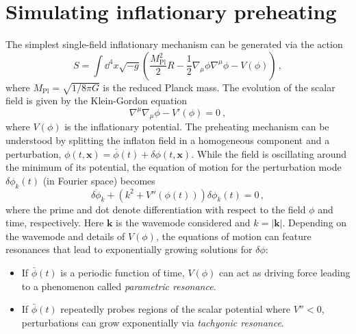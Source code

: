 \documentclass[
    reprint,
    preprintnumbers,
    superscriptaddress,
    nofootinbib,
     amsmath,amssymb,
     aps,
     prd,
    floatfix,
    ]{revtex4-2}
\newcommand{\mpl}{M_\mathrm{Pl}}
\begin{document}
\newpage

\section{Simulating inflationary preheating}
\label{sec:methods}

The simplest single-field inflationary mechanism can be generated via the action \begin{equation}
    S = \int \dd^4 x \sqrt{-g}\left(\frac{\mpl^2}{2}R - \frac{1}{2}\nabla_{\mu}\phi\nabla^{\mu}\phi - V(\phi)\right)\,,
\end{equation}
where $\mpl = \sqrt{1/8\pi G}$ is the reduced Planck mass. The evolution of the scalar field is given by the Klein-Gordon equation
\begin{equation}\label{eq:EKG_cov}
    \nabla^\mu \nabla_\mu \phi - V'(\phi) = 0~,
\end{equation}
where $V(\phi)$ is the inflationary potential. The preheating mechanism can be understood by splitting the inflaton field in a homogeneous component and a perturbation, $\phi(t, \mathbf{x}) = \bar{\phi}(t) + \delta\phi(t, \mathbf{x})$. While the field is oscillating around the minimum of its potential, %
the equation of motion for the perturbation mode $\delta\phi_k(t)$ (in Fourier space) becomes
\begin{equation}
    \delta\ddot\phi_k + \left(k^2 + V''\left(\phi(t)\right)\right) \delta\phi_k(t) = 0  \,,
    \label{eq:PerturbationsEOM}
\end{equation}
where the prime and dot denote differentiation with respect to the field $\phi$ and time, respectively. Here $\mathbf{k}$ is the wavemode considered and $k = |\mathbf{k}|$. Depending on the wavemode and details of $V(\phi)$, the equations of motion can feature resonances that lead to exponentially growing solutions for $\delta\phi$:
\begin{itemize}[leftmargin=*]
\item If $\bar{\phi}(t)$ is a periodic function of time, $V(\phi)$ can act as driving force leading to a phenomenon called \textit{parametric resonance}. 
\item If $\bar{\phi}(t)$ repeatedly probes regions of the scalar potential where $V'' < 0$, perturbations can grow exponentially via \textit{tachyonic resonance}. 
\end{itemize}
\end{document}
